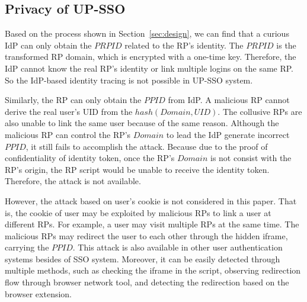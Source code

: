 \subsection{Privacy of UP-SSO}
Based on the process shown in Section~\ref{sec:design}, we can find that a curious IdP can only obtain the $PRPID$ related to the RP's identity. The $PRPID$ is the transformed RP domain, which is encrypted with a one-time key. Therefore, the IdP cannot know the real RP's identity or link multiple logins on the same RP. So the IdP-based identity tracing is not possible in UP-SSO system. 

Similarly, the RP can only obtain the $PPID$ from IdP. A malicious RP cannot derive the real user's UID from the $hash(Domain, UID)$. The collusive RPs are also unable to link the same user because of the same reason. Although the malicious RP can control the RP's $Domain$ to lead the IdP generate incorrect $PPID$, it still fails to accomplish the attack. Because due to the proof of confidentiality of identity token, once the RP's $Domain$ is not consist with the RP's origin, the RP script would be unable to receive the identity token. Therefore, the attack is not available. 

However, the attack based on user's cookie is not considered in this paper. That is, the cookie of user may be exploited by malicious RPs to link a user at different RPs. For example, a user may visit multiple RPs at the same time. The malicious RPs may redirect the user to each other through the hidden iframe, carrying the $PPID$. This attack is also available in other user authentication systems besides of SSO system. Moreover, it can be easily detected through multiple methods, such as checking the iframe in the script, observing redirection flow through browser network tool, and detecting the redirection based on the browser extension.



























